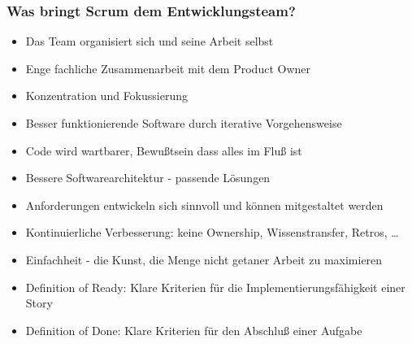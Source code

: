 \frame
{
  \frametitle{Was bringt Scrum dem Entwicklungsteam?}
  \begin{itemize}
    \item{Das Team organisiert sich und seine Arbeit selbst}
    \item{Enge fachliche Zusammenarbeit mit dem Product Owner}
    \item{Konzentration und Fokussierung}
    \item{Besser funktionierende Software durch iterative Vorgehensweise}
    \item{Code wird wartbarer, Bewußtsein dass alles im Fluß ist}
    \item{Bessere Softwarearchitektur - passende Lösungen}
    \item{Anforderungen entwickeln sich sinnvoll und können mitgestaltet werden}
    \item{Kontinuierliche Verbesserung: keine Ownership, Wissenstransfer, Retros, \dots}
    \item{Einfachheit - die Kunst, die Menge nicht getaner Arbeit zu maximieren}
    \item{Definition of Ready: Klare Kriterien für die Implementierungsfähigkeit einer Story}
    \item{Definition of Done: Klare Kriterien für den Abschluß einer Aufgabe}
  \end{itemize}
}




